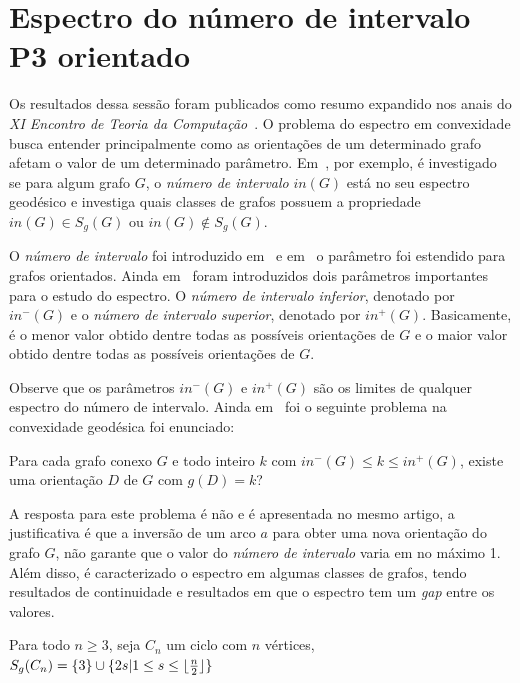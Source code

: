 \chapter{Espectro do número de intervalo P3 orientado}\label{3-espectro}

Os resultados dessa sessão foram publicados como resumo expandido nos anais do \emph{XI Encontro de Teoria da Computação}~\cite{ALVARO2026}. O problema do espectro em convexidade busca entender principalmente como as orientações de um determinado grafo afetam o valor de um determinado parâmetro. Em~\cite{Lu2007}, por exemplo, é investigado se para algum grafo $G$, o \emph{número de intervalo} $in(G)$ está no seu espectro geodésico e investiga quais classes de grafos possuem a propriedade $in(G) \in S_g(G)$ ou $in(G) \notin S_g(G)$.

O \emph{número de intervalo} foi introduzido em~\cite{HARARY199389} e em~\cite{CHARTRAND2000181} o parâmetro foi estendido para grafos orientados. Ainda em~\cite{CHARTRAND2000181} foram introduzidos dois parâmetros importantes para o estudo do espectro. O \emph{número de intervalo inferior}, denotado por $in^-(G)$ e o \emph{número de intervalo superior}, denotado por $in^+(G)$. Basicamente, é o menor valor obtido dentre todas as possíveis orientações de $G$ e o maior valor obtido dentre todas as possíveis orientações de $G$.

Observe que os parâmetros $in^-(G)$ e $in^+(G)$ são os limites de qualquer espectro do número de intervalo. Ainda em~\cite{HARARY199389} foi o seguinte problema na convexidade geodésica foi enunciado:

\begin{pro}
	Para cada grafo conexo $G$ e todo inteiro $k$ com $in^-(G) \leq k \leq in^+(G)$, existe uma orientação $D$ de $G$ com $g(D) = k$?
\end{pro}

A resposta para este problema é não e é apresentada no mesmo artigo, a justificativa é que a inversão de um arco $a$ para obter uma nova orientação do grafo $G$, não garante que o valor do \emph{número de intervalo} varia em no máximo 1. Além disso, é caracterizado o espectro em algumas classes de grafos, tendo resultados de continuidade e resultados em que o espectro tem um \emph{gap} entre os valores.

\begin{theorem}
	Para todo $n \geq 3$, seja $C_n$ um ciclo com $n$ vértices, $S_g(C_n) = \{3\} \cup \{2s \lvert 1 \leq s \leq \lfloor\frac{n}{2}\rfloor\}$
\end{theorem}

